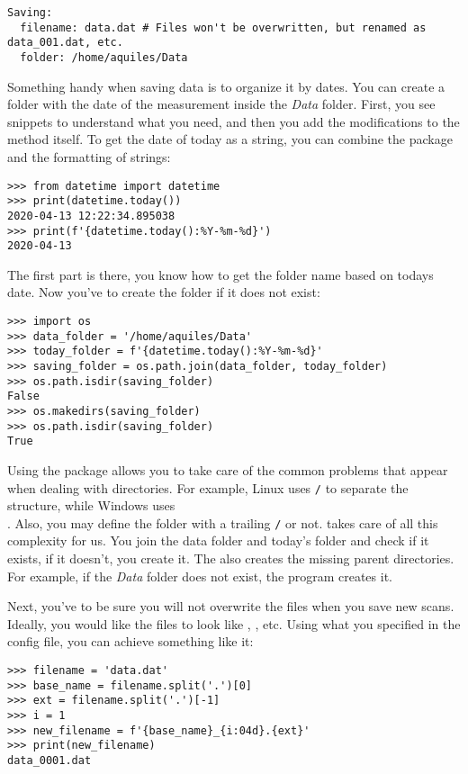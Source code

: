 \begin{verbatim}
Saving:
  filename: data.dat # Files won't be overwritten, but renamed as data_001.dat, etc.
  folder: /home/aquiles/Data
\end{verbatim}

Something handy when saving data is to organize it by dates. You can create a folder with the date of the measurement inside the \emph{Data} folder. First, you see snippets to understand what you need, and then you add the modifications to the method itself. To get the date of today as a string, you can combine the  package and the formatting of strings:

\begin{verbatim}
>>> from datetime import datetime
>>> print(datetime.today())
2020-04-13 12:22:34.895038
>>> print(f'{datetime.today():%Y-%m-%d}')
2020-04-13
\end{verbatim}

The first part is there, you know how to get the folder name based on todays date. Now you've to create the folder if it does not exist:

\begin{verbatim}
>>> import os
>>> data_folder = '/home/aquiles/Data'
>>> today_folder = f'{datetime.today():%Y-%m-%d}'
>>> saving_folder = os.path.join(data_folder, today_folder)
>>> os.path.isdir(saving_folder)
False
>>> os.makedirs(saving_folder)
>>> os.path.isdir(saving_folder)
True
\end{verbatim}

Using the package  allows you to take care of the common problems that appear when dealing with directories. For example, Linux uses \texttt{/} to separate the structure, while Windows uses \texttt{\\}. Also, you may define the folder with a trailing \texttt{/} or not.  takes care of all this complexity for us. You join the data folder and today's folder and check if it exists, if it doesn't, you create it. The  also creates the missing parent directories. For example, if the \emph{Data} folder does not exist, the program creates it.

Next, you've to be sure you will not overwrite the files when you save new scans. Ideally, you would like the files to look like , , etc. Using what you specified in the config file, you can achieve something like it:

\begin{verbatim}
>>> filename = 'data.dat'
>>> base_name = filename.split('.')[0]
>>> ext = filename.split('.')[-1]
>>> i = 1
>>> new_filename = f'{base_name}_{i:04d}.{ext}'
>>> print(new_filename)
data_0001.dat
\end{verbatim}

